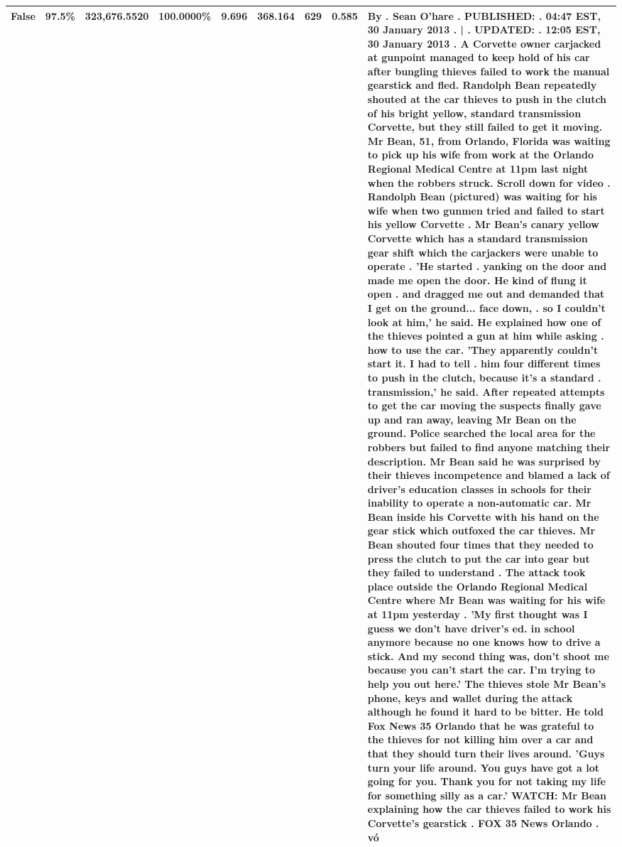 \begin{table}[H]
\begin{tabular}{|m{}| m{}| r | R{0.13\textwidth}| R{0.09\textwidth}| R{0.09\textwidth}| R{0.09\textwidth}| R{0.11\textwidth}|}
False & 97.5\% & 323,676.5520 & \bfseries \color{red} 100.0000\% & 9.696 & 368.164 & 629 & 0.585 & By . Sean O'hare . PUBLISHED: . 04:47 EST, 30 January 2013 . | . UPDATED: . 12:05 EST, 30 January 2013 . A Corvette owner carjacked at gunpoint managed to keep hold of his car after bungling thieves failed to work the manual gearstick and fled. Randolph Bean repeatedly shouted at the car thieves to push in the clutch of his bright yellow, standard transmission Corvette, but they still failed to get it moving. Mr Bean, 51, from Orlando, Florida was waiting to pick up his wife from work at the Orlando Regional Medical Centre at 11pm last night when the robbers struck. Scroll down for video . Randolph Bean (pictured) was waiting for his wife when two gunmen tried and failed to start his yellow Corvette . Mr Bean's canary yellow Corvette which has a standard transmission gear shift which the carjackers were unable to operate . 'He started . yanking on the door and made me open the door. He kind of flung it open . and dragged me out and demanded that I get on the ground... face down, . so I couldn't look at him,' he said. He explained how one of the thieves pointed a gun at him while asking . how to use the car. 'They apparently couldn't start it. I had to tell . him four different times to push in the clutch, because it's a standard . transmission,' he said. After repeated attempts to get the car moving the suspects finally gave up and ran away, leaving Mr Bean on the ground. Police searched the local area for the robbers but failed to find anyone matching their description. Mr Bean said he was surprised by their thieves incompetence and blamed a lack of driver's education classes in schools for their inability to operate a non-automatic car. Mr Bean inside his Corvette with his hand on the gear stick which outfoxed the car thieves. Mr Bean shouted four times that they needed to press the clutch to put the car into gear but they failed to understand . The attack took place outside the Orlando Regional Medical Centre where Mr Bean was waiting for his wife at 11pm yesterday . 'My first thought was I guess we don't have driver's ed. in school anymore because no one knows how to drive a stick. And my second thing was, don't shoot me because you can't start the car. I'm trying to help you out here.' The thieves stole Mr Bean's phone, keys and wallet during the attack although he found it hard to be bitter. He told Fox News 35 Orlando that he was grateful to the thieves for not killing him over a car and that they should turn their lives around. 'Guys turn your life around. You guys have got a lot going for you. Thank you for not taking my life for something silly as a car.' WATCH: Mr Bean explaining how the car thieves failed to work his Corvette's gearstick . FOX 35 News Orlando . vó \\
\bottomrule
\end{tabular}
\end{table}
